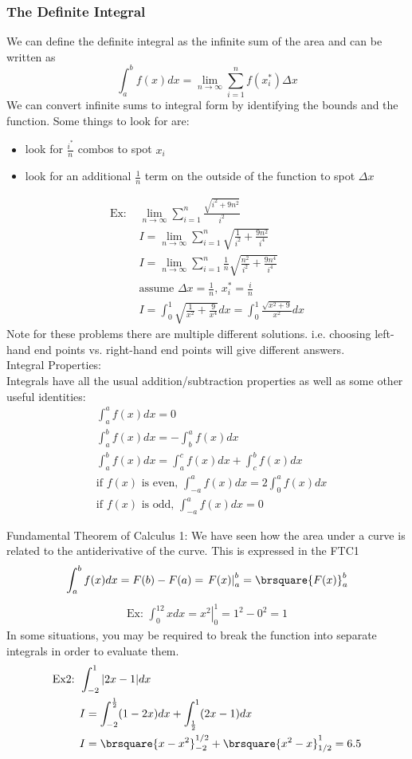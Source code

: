 \subsubsection{The Definite Integral}
We can define the definite integral as the infinite sum of the area and can be written as
$$\int_a^bf(x)dx=\lim_{n\to\infty}\sum_{i=1}^nf(x_i^*)\Delta x$$
We can convert infinite sums to integral form by identifying the bounds and the function. Some things to look for are:
\begin{itemize}
    \item look for $\frac{i^*}{n}$ combos to spot $x_i$
    \item look for an additional $\frac{1}{n}$ term on the outside of the function to spot $\Delta x$
\end{itemize}
\begin{align*}
    \text{Ex: }&\lim_{n\to\infty}\sum_{i=1}^n\frac{\sqrt{i^2+9n^2}}{i^2}\\
    &I=\lim_{n\to\infty}\sum_{i=1}^n\sqrt{\frac{1}{i^2}+\frac{9n^2}{i^4}}\\
    &I=\lim_{n\to\infty}\sum_{i=1}^n\frac{1}{n}\sqrt{\frac{n^2}{i^2}+\frac{9n^4}{i^4}}\\
    &\text{assume }\Delta x=\frac{1}{n},\,x_i^*=\frac{i}{n}\\
    &I=\int_0^1\sqrt{\frac{1}{x^2}+\frac{9}{x^4}}dx=\int_0^1\frac{\sqrt{x^2+9}}{x^2}dx
\end{align*}
Note for these problems there are multiple different solutions. i.e. choosing left-hand end points vs. right-hand end points will give different answers.\\

Integral Properties:\\
Integrals have all the usual addition/subtraction properties as well as some other useful identities:
\begin{align*}
    &\int_a^af(x)dx=0\\
    &\int_a^bf(x)dx=-\int_b^af(x)dx\\
    &\int_a^bf(x)dx=\int_a^cf(x)dx+\int_c^bf(x)dx\\
    &\text{if $f(x)$ is even, }\int_{-a}^af(x)dx=2\int_0^af(x)dx\\
    &\text{if $f(x)$ is odd, }\int_{-a}^af(x)dx=0
\end{align*}

Fundamental Theorem of Calculus 1:
We have seen how the area under a curve is related to the antiderivative of the curve. This is expressed in the FTC1
$$\int_a^b f(x)dx=F(b)-F(a)=\left.F(x)\right|^b_a=\brsquare{F(x)}^b_a$$
\begin{align*}
    \text{Ex: }\int_0^12xdx=\left.x^2\right|_0^1=1^2-0^2=1
\end{align*}
In some situations, you may be required to break the function into separate integrals in order to evaluate them.
\begin{align*}
    \text{Ex2: }&\int_{-2}^1|2x-1|dx\\
    &I=\int_{-2}^{\frac{1}{2}}(1-2x)dx+\int_{\frac{1}{2}}^1(2x-1)dx\\
    &I=\brsquare{x-x^2}_{-2}^{1/2}+\brsquare{x^2-x}_{1/2}^1=6.5
\end{align*}

